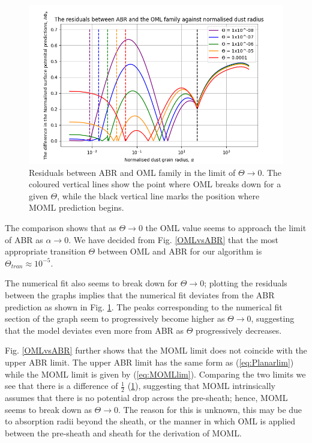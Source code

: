 \documentclass[journal]{Imperial_lab_report}
\begin{document}
\begin{figure}[H]
\centering
\includegraphics[width=\linewidth]{Output/Residuals.jpeg}
\caption{Residuals between ABR and OML family in the limit of  $\Theta \xrightarrow{} 0$. The coloured vertical lines show the point where OML breaks down for a given $\Theta$, while the black vertical line marks the position where MOML prediction begins.}
\label{Residuals} 
\end{figure}

The comparison shows that as $\Theta \xrightarrow{} 0$ the OML value seems to approach the limit of ABR as $\alpha \xrightarrow{} 0$. We have decided from Fig. \ref{OMLvsABR} that the most appropriate transition $\Theta$ between OML and ABR for our algorithm is $\Theta_{tran} \approx 10^{-5}$.

\smallskip

The numerical fit also seems to break down for $\Theta \xrightarrow{} 0$; plotting the residuals between the graphs implies that the numerical fit deviates from the ABR prediction as shown in Fig. \ref{Residuals}. The peaks corresponding to the numerical fit section of the graph seem to progressively become higher as $\Theta \xrightarrow{} 0$, suggesting that the model deviates even more from ABR as $\Theta$ progressively decreases.

\smallskip

Fig. \ref{OMLvsABR} further shows that the MOML limit does not coincide with the upper ABR limit. The upper ABR limit has the same form as (\ref{eq:Planarlim}) while the MOML limit is given by (\ref{eq:MOMLlim}). Comparing the two limits we see that there is a difference of $\frac{1}{2}$ (\ref{Residuals}), suggesting that MOML intrinsically assumes that there is no potential drop across the pre-sheath; hence, MOML seems to break down as $\Theta \xrightarrow{} 0$. The reason for this is unknown, this may be due to absorption radii beyond the sheath, or the manner in which OML is applied between the pre-sheath and sheath for the derivation of MOML.
\end{document}
